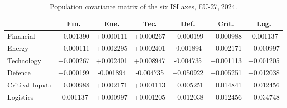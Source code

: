 \begin{table}[htbp]
\centering
\caption{Population covariance matrix of the six ISI axes, EU-27, 2024.}
\label{tab:cov-matrix}
\small
\setlength{\tabcolsep}{4pt}
\begin{tabular*}{\textwidth}{@{\extracolsep{\fill}}
  l S S S S S S @{}}
\toprule
 & {\textbf{Fin.}} & {\textbf{Ene.}} & {\textbf{Tec.}} & {\textbf{Def.}} & {\textbf{Crit.}} & {\textbf{Log.}} \\
\midrule
  Financial       & +0.001390 & +0.000111 & +0.000267 & +0.000199 & +0.000988 & -0.001137 \\
  Energy          & +0.000111 & +0.002295 & +0.002401 & -0.001894 & +0.002171 & +0.000997 \\
  Technology      & +0.000267 & +0.002401 & +0.008947 & -0.004735 & +0.001113 & +0.001205 \\
  Defence         & +0.000199 & -0.001894 & -0.004735 & +0.050922 & +0.005251 & +0.012038 \\
  Critical Inputs & +0.000988 & +0.002171 & +0.001113 & +0.005251 & +0.014841 & +0.012456 \\
  Logistics       & -0.001137 & +0.000997 & +0.001205 & +0.012038 & +0.012456 & +0.034748 \\
\bottomrule
\end{tabular*}
\end{table}

